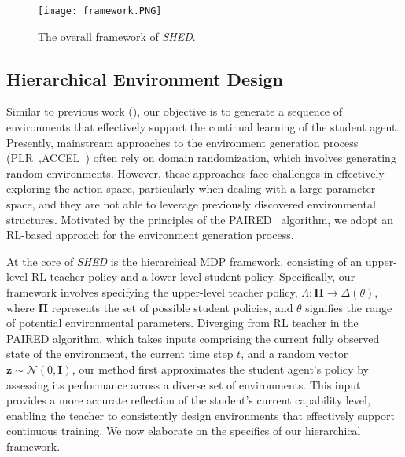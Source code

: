 \documentclass{article}
\newcommand\algo{\emph{SHED }}
\newcommand\mI{\bm{I}}
\newcommand\vz{\bm{z}}
\begin{document}
\begin{figure}[t]
    \centering
    \texttt{[image: framework.PNG]}
    \caption{The overall framework of {\em SHED}.}\label{fig:framework}
\end{figure}







\subsection{Hierarchical Environment Design}


Similar to previous work (\citep{dennis2020emergent}), our objective is to generate a sequence of environments that effectively support the continual learning of the student agent. Presently, mainstream approaches to the environment generation process (PLR~\citep{jiang2021replay},ACCEL~\citep{parker2022evolving}) often rely on domain randomization, which involves generating random environments. However, these approaches face challenges in effectively exploring the action space, particularly when dealing with a large parameter space, and they are not able to leverage previously discovered environmental structures. Motivated by the principles of the PAIRED~\citep{dennis2020emergent} algorithm, we adopt an RL-based approach for the environment generation process.

At the core of \algo is the hierarchical MDP framework, consisting of an upper-level RL teacher policy and a lower-level student policy. 
Specifically, our framework involves specifying the upper-level teacher policy, $\Lambda:\bm{\Pi} \rightarrow \Delta(\mathbb{\theta})$, where $\bm{\Pi}$ represents the set of possible student policies, and $\mathbb{\theta}$ signifies the range of potential environmental parameters.
Diverging from RL teacher in the PAIRED algorithm, which takes inputs comprising the current fully observed state of the environment, the current time step $t$, and a random vector $\vz\sim \mathcal{N}(0,\mI)$, our method first approximates the student agent's policy by assessing its performance across a diverse set of environments. This input provides a more accurate reflection of the student's current capability level, enabling the teacher to consistently design environments that effectively support continuous training. We now elaborate on the specifics of our hierarchical framework. 
\end{document}
